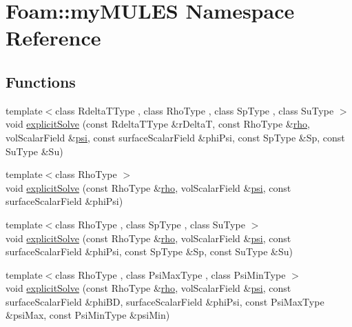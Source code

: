 \hypertarget{namespaceFoam_1_1myMULES}{}\section{Foam\+:\+:my\+M\+U\+L\+ES Namespace Reference}
\label{namespaceFoam_1_1myMULES}
\subsection*{Functions}
\begin{DoxyCompactItemize}
\item 
{\footnotesize template$<$class Rdelta\+T\+Type , class Rho\+Type , class Sp\+Type , class Su\+Type $>$ }\\void \hyperlink{namespaceFoam_1_1myMULES_a62d251545cddb4d8e55512c4a86dcabf}{explicit\+Solve} (const Rdelta\+T\+Type \&r\+DeltaT, const Rho\+Type \&\hyperlink{EEqn__1pl_8H_ac955f87ac2b79f02f420cae087fc52b1}{rho}, vol\+Scalar\+Field \&\hyperlink{UEqn__1pl_8H_a165a34deec3ee505598e511a88831968}{psi}, const surface\+Scalar\+Field \&phi\+Psi, const Sp\+Type \&Sp, const Su\+Type \&Su)
\item 
{\footnotesize template$<$class Rho\+Type $>$ }\\void \hyperlink{namespaceFoam_1_1myMULES_a1ce91b0273238f6ddf198f582a9fd806}{explicit\+Solve} (const Rho\+Type \&\hyperlink{EEqn__1pl_8H_ac955f87ac2b79f02f420cae087fc52b1}{rho}, vol\+Scalar\+Field \&\hyperlink{UEqn__1pl_8H_a165a34deec3ee505598e511a88831968}{psi}, const surface\+Scalar\+Field \&phi\+Psi)
\item 
{\footnotesize template$<$class Rho\+Type , class Sp\+Type , class Su\+Type $>$ }\\void \hyperlink{namespaceFoam_1_1myMULES_ad80f7a3f7f83c1be0a382eb457325995}{explicit\+Solve} (const Rho\+Type \&\hyperlink{EEqn__1pl_8H_ac955f87ac2b79f02f420cae087fc52b1}{rho}, vol\+Scalar\+Field \&\hyperlink{UEqn__1pl_8H_a165a34deec3ee505598e511a88831968}{psi}, const surface\+Scalar\+Field \&phi\+Psi, const Sp\+Type \&Sp, const Su\+Type \&Su)
\item 
{\footnotesize template$<$class Rho\+Type , class Psi\+Max\+Type , class Psi\+Min\+Type $>$ }\\void \hyperlink{namespaceFoam_1_1myMULES_a408d6816b699a04ddd3b290bebe08748}{explicit\+Solve} (const Rho\+Type \&\hyperlink{EEqn__1pl_8H_ac955f87ac2b79f02f420cae087fc52b1}{rho}, vol\+Scalar\+Field \&\hyperlink{UEqn__1pl_8H_a165a34deec3ee505598e511a88831968}{psi}, const surface\+Scalar\+Field \&phi\+BD, surface\+Scalar\+Field \&phi\+Psi, const Psi\+Max\+Type \&psi\+Max, const Psi\+Min\+Type \&psi\+Min)

\end{DoxyCompactItemize}
